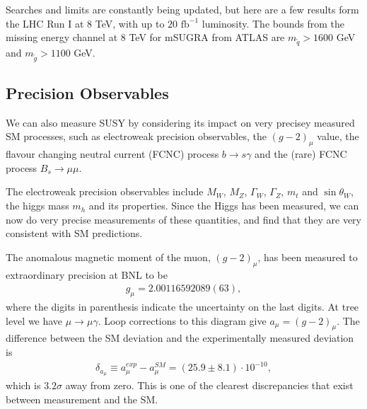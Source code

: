 \documentclass[twoside,english]{uiofysmaster}
\begin{document}
Searches and limits are constantly being updated, but here are a few results form the LHC Run I at 8 TeV, with up to $20 \text{ fb}^{-1}$ luminosity. The bounds from the missing energy channel at 8 TeV for mSUGRA from ATLAS are $m_{\tilde{q}} > 1600$ GeV and $m_{\tilde{g}} > 1100$ GeV.

\subsection{Precision Observables}

We can also measure SUSY by considering its impact on very precisey measured SM processes, such as electroweak precision observables, the $(g-2)_{\mu}$ value, the flavour changing neutral current (FCNC) process $b \rightarrow s \gamma$ and the (rare) FCNC process $B_s \rightarrow \mu \mu$.

The electroweak precision observables include $M_W$, $M_Z$, $\Gamma_W$, $\Gamma_Z$, $m_t$ and $\sin \theta_W$, the higgs mass $m_h$ and its properties. Since the Higgs has been measured, we can now do very precise measurements of these quantities, and find that they are very consistent with SM predictions.

The anomalous magnetic moment of the muon, $(g - 2)_{\mu}$, has been measured to extraordinary precision at BNL to be
\begin{align*}
g_{\mu} = 2.00116592089(63),
\end{align*}
where the digits in parenthesis indicate the uncertainty on the last digits. At tree level we have $\mu \rightarrow \mu \gamma$. Loop corrections to this diagram give $a_{\mu} = (g -2)_{\mu}$. The difference between the SM deviation and the experimentally measured deviation is
\begin{align*}
\delta_{a_{\mu}} \equiv a_{\mu}^{exp} - a_{\mu}^{SM}= (25.9 \pm 8.1) \cdot 10^{-10},
\end{align*}
which is $3.2 \sigma$ away from zero. This is one of the clearest discrepancies that exist between measurement and the SM.
\end{document}
